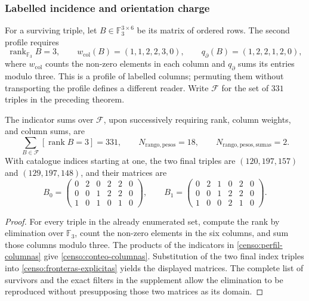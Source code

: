 \subsubsection{Labelled incidence and orientation charge}

For a surviving triple, let \(B\in\mathbb F_3^{3\times6}\) be its
matrix of ordered rows. The second profile requires
\begin{equation}
 \operatorname{rank}_{\mathbb F_3}B=3,\qquad
 w_{\mathrm{col}}(B)=(1,1,2,2,3,0),\qquad
 q_{\partial}(B)=(1,2,2,1,2,0),
 \label{censo:perfil-columnas}
\end{equation}
where \(w_{\mathrm{col}}\) counts the non-zero elements in each
column and \(q_{\partial}\) sums its entries modulo three. This is a profile
of labelled columns; permuting them without transporting the profile defines a
different reader. Write \(\mathcal F\) for the set of \(331\) triples
in the preceding theorem.

\begin{proposition}
\label{censo:dos-matrices}
The indicator sums over \(\mathcal F\), upon successively requiring
rank, column weights, and column sums, are
\begin{equation}
 \sum_{B\in\mathcal F}[\operatorname{rank}B=3]=331,
 \qquad N_{\mathrm{rango,pesos}}=18,
 \qquad N_{\mathrm{rango,pesos,sumas}}=2.
 \label{censo:conteo-columnas}
\end{equation}
With catalogue indices starting at one, the two final triples are
\((120,197,157)\) and \((129,197,148)\), and their matrices are
\[
 B_0=\begin{pmatrix}0&2&0&2&2&0\\0&0&1&2&2&0\\1&0&1&0&1&0\end{pmatrix},
 \qquad
 B_1=\begin{pmatrix}0&2&1&0&2&0\\0&0&1&2&2&0\\1&0&0&2&1&0\end{pmatrix}.
\]
\end{proposition}
\begin{proof}
For every triple in the already enumerated set, compute the rank by
elimination over \(\mathbb F_3\), count the non-zero elements in the six
columns, and sum those columns modulo three. The products of the
indicators in \eqref{censo:perfil-columnas} give \eqref{censo:conteo-columnas}.
Substitution of the two final index triples into
\eqref{censo:fronteras-explicitas} yields the displayed matrices. The complete
list of survivors and the exact filters in the supplement allow the
elimination to be reproduced without presupposing those two matrices as its domain.
\end{proof}

